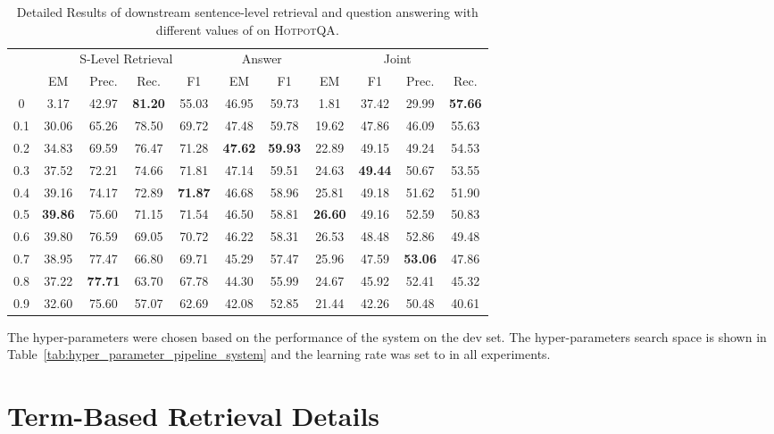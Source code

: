 \documentclass[11pt,a4paper]{article}
\newcommand\hpqa{\textsc{HotpotQA}\xspace}
\begin{document}
\begin{table*}[t]
\centering
\begin{tabular}{ccccccccccc}
\toprule
\multirow{2}{*}{} &
\multicolumn{4}{c}{S-Level Retrieval} &
\multicolumn{2}{c}{Answer} &
\multicolumn{4}{c}{Joint} \\
\cmidrule(lr){2-5}
\cmidrule(lr){6-7}
\cmidrule(lr){8-11}
 & EM & Prec. & Rec. & F1 & EM & F1 & EM & F1 & Prec. & Rec.\\
\midrule
0 & 3.17 &  42.97  & \textbf{81.20} & 55.03 & 46.95 & 59.73 & 1.81  & 37.42 & 29.99 & \textbf{57.66} \\
0.1 & 30.06 & 65.26 & 78.50 & 69.72 & 47.48 & 59.78 & 19.62 & 47.86 & 46.09 & 55.63\\
0.2 & 34.83 & 69.59 & 76.47 & 71.28 & \textbf{47.62} & \textbf{59.93} & 22.89 & 49.15 & 49.24 & 54.53\\
0.3 & 37.52 & 72.21 & 74.66 & 71.81 & 47.14 & 59.51 & 24.63 & \textbf{49.44} & 50.67 & 53.55\\
0.4 & 39.16 & 74.17 & 72.89 & \textbf{71.87} & 46.68 & 58.96 & 25.81 & 49.18 & 51.62 & 51.90\\
0.5 & \textbf{39.86} & 75.60 & 71.15 & 71.54 & 46.50 & 58.81 & \textbf{26.60} & 49.16 & 52.59 & 50.83\\
0.6 & 39.80 & 76.59 & 69.05 & 70.72 & 46.22 & 58.31 & 26.53 & 48.48 & 52.86 & 49.48\\
0.7 & 38.95 & 77.47 & 66.80 & 69.71 & 45.29 & 57.47 & 25.96 & 47.59 & \textbf{53.06} & 47.86\\
0.8 & 37.22 & \textbf{77.71} & 63.70 & 67.78 & 44.30 & 55.99 & 24.67 & 45.92 & 52.41 & 45.32\\
0.9 & 32.60 & 75.60 & 57.07 & 62.69 & 42.08 & 52.85 & 21.44 & 42.26 & 50.48 & 40.61\\
\bottomrule
\end{tabular}
\caption{Detailed Results of downstream sentence-level retrieval and question answering with different values of  on \hpqa.}
\label{tab:hotpot_detail_s_level_results}
\end{table*}


The hyper-parameters were chosen based on the performance of the system on the dev set. The hyper-parameters search space is shown in Table~\ref{tab:hyper_parameter_pipeline_system} and the learning rate was set to  in all experiments.

\section{Term-Based Retrieval Details}
\end{document}
